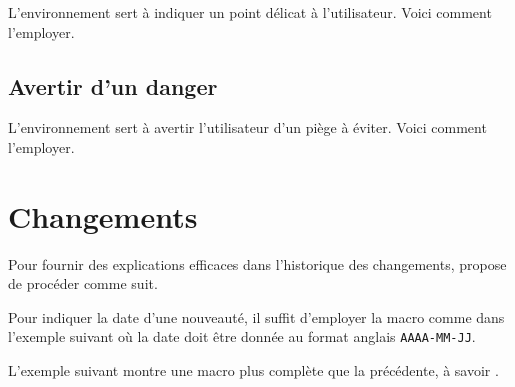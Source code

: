 \documentclass[10pt, a4paper]{article}
\begin{document}
L'environnement  sert à indiquer un point délicat à  l'utilisateur. Voici comment l'employer.




\subsection{Avertir d'un danger}

L'environnement  sert à avertir l'utilisateur d'un piège à éviter. Voici comment l'employer.



\section{Changements}

\begin{bdocexa}
    Pour fournir des explications efficaces dans l'historique des changements,  propose de procéder comme suit.

\end{bdocexa}




\begin{bdocexa}
    Pour indiquer la date d'une nouveauté, il suffit d'employer la macro  comme dans l'exemple suivant où la date doit être donnée au format anglais \texttt{AAAA-MM-JJ}.

\end{bdocexa}




\begin{bdocexa}
    L'exemple suivant montre une macro plus complète que la précédente, à savoir .

\end{bdocexa}
\end{document}
